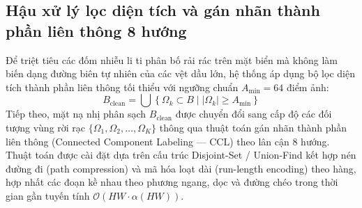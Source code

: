 \subsection{Hậu xử lý lọc diện tích và gán nhãn thành phần liên thông 8 hướng}

Để triệt tiêu các đốm nhiễu li ti phân bố rải rác trên mặt biển mà không làm biến dạng đường biên tự nhiên của các vệt dầu lớn, hệ thống áp dụng bộ lọc diện tích thành phần liên thông tối thiểu với ngưỡng chuẩn $A_{\min} = 64$ điểm ảnh:
\begin{equation}
B_{\text{clean}} = \bigcup \left\{ \Omega_k \subset B \mid |\Omega_k| \ge A_{\min} \right\}
\label{eq:area_filtering}
\end{equation}
Tiếp theo, mặt nạ nhị phân sạch $B_{\text{clean}}$ được chuyển đổi sang cấp độ các đối tượng vùng rời rạc $\{\Omega_1, \Omega_2, \dots, \Omega_K\}$ thông qua thuật toán gán nhãn thành phần liên thông (Connected Component Labeling --- CCL) theo lân cận 8 hướng. Thuật toán được cài đặt dựa trên cấu trúc Disjoint-Set / Union-Find kết hợp nén đường đi (path compression) và mã hóa loạt dài (run-length encoding) theo hàng, hợp nhất các đoạn kề nhau theo phương ngang, dọc và đường chéo trong thời gian gần tuyến tính $\mathcal{O}(HW \cdot \alpha(HW))$.
